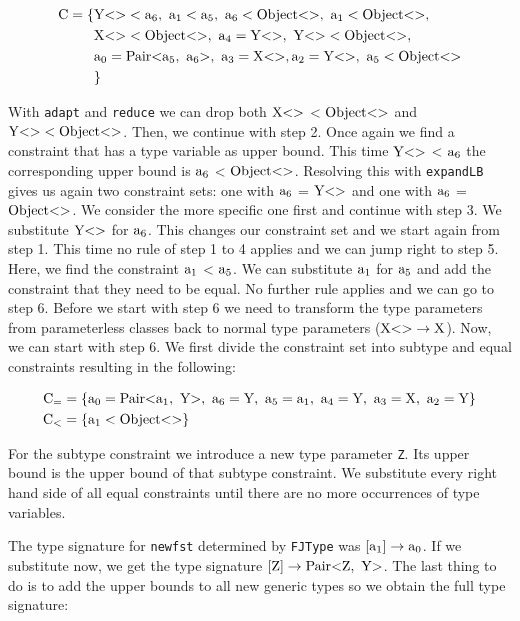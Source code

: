 \begin{align*}
    \text{C} = \{& \nvtt{Y}{} < \fa{6}, \ \fa{1} < \fa{5}, \ \fa{6} < \nvtt{Object}{}, \ \fa{1} < \nvtt{Object}{}, \\
    &\nvtt{X}{} < \nvtt{Object}{}, \ \fa{4} = \nvtt{Y}{}, \ \nvtt{Y}{} < \nvtt{Object}{}, \\
    &\fa{0} = \nvtt{Pair}{\fa{5}, \ \fa{6}}, \ \fa{3} = \nvtt{X}{}, \fa{2} = \nvtt{Y}{}, \ \fa{5} < \nvtt{Object}{} \\
    &\}
\end{align*}

With \verb|adapt| and \verb|reduce| we can drop both $\text{X} \text{<}  \text{>}$ < $\text{Object} \text{<}  \text{>}$ and $\text{Y} \text{<}  \text{>} < \text{Object} \text{<}  \text{>}$. Then, we continue with step 2.
Once again we find a constraint that has a type variable as upper bound. This time $\text{Y} \text{<}  \text{>}$ < $\text{a}_{6}$ the corresponding upper bound is $\text{a}_{6}$ < $\text{Object} \text{<}  \text{>}$.
Resolving this with \verb|expandLB| gives us again two constraint sets: one with $\text{a}_{6}$ = $\text{Y} \text{<}  \text{>}$ and one with $\text{a}_{6}$ = $\text{Object} \text{<}  \text{>}$. We consider the more specific one first and continue with step 3.
We substitute $\text{Y} \text{<}  \text{>}$ for $\text{a}_{6}$. This changes our constraint set and we start again from step 1. This time no rule of step 1 to 4 applies and we can jump right to step 5.
Here, we find the constraint $\text{a}_{1}$ < $\text{a}_{5}$. We can substitute $\text{a}_{1}$ for $\text{a}_{5}$ and add the constraint that they need to be equal.
No further rule applies and we can go to step 6. Before we start with step 6 we need to transform the type parameters from parameterless classes back to normal type parameters ($\text{X} \text{<}  \text{>} \to \text{X}$). Now, we can start with step 6. We first divide the constraint set into subtype and equal constraints resulting in the following:

\begin{align*}
    \text{C}_= &= \{ \fa{0} = \nvtt{Pair}{\fa{1}, \ \text{Y}}, \ \fa{6} = \text{Y}, \ \fa{5} = \fa{1}, \ \fa{4} = \text{Y}, \ \fa{3} = \text{X}, \ \fa{2} = \text{Y} \}\\
    \text{C}_< &= \{ \fa{1} < \nvtt{Object}{} \}
\end{align*}

For the subtype constraint we introduce a new type parameter \verb|Z|. Its upper bound is the upper bound of that subtype constraint.
We substitute every right hand side of all equal constraints until there are no more occurrences of type variables.

The type signature for \verb|newfst| determined by \verb|FJType| was $[\text{a}_{1}] \to \text{a}_{0}$. If we substitute now, we get the type signature $[\text{Z}] \to \nvtt{Pair}{\text{Z}, \ \text{Y}}$.
The last thing to do is to add the upper bounds to all new generic types so we obtain the full type signature:

